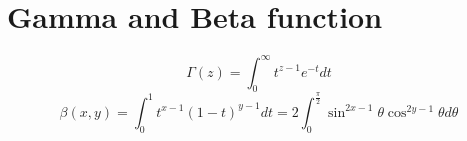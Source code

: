 \documentclass[
]{article}
\author{}
\date{}
\begin{document}
\[
\newcommand{\R}{\mathbb{R}}
\newcommand{\com}{\mathbb{C}}
\newcommand{\N}{\mathbb{N}}
\newcommand{\Z}{\mathbb{Z}}
\newcommand{\e}{\varepsilon}
\newcommand{\sequence}[1]{(#1_n)_{n=1}^{\infty}}
\newcommand{\braces}[1]{\left\{#1\right\}}
\newcommand{\ra}{\rightarrow}
\newcommand{\pdiff}[2]{\frac{\partial #1}{\partial #2}}
\newcommand{\diff}[3]{\frac{d^{#3}#1}{d#2^{#3}}}
\newcommand{\summ}[2]{\sum_{#1}^{#2}}
\newcommand{\fbraks}[1]{\left(#1\right)}
\newcommand{\tbraks}[1]{\left[#1\right]}
\]

\hypertarget{gamma-and-beta-function}{%
\section{Gamma and Beta function}\label{gamma-and-beta-function}}

\[\Gamma(z) = \int_0^\infty t^{z-1}e^{-t}dt\]
\[\beta(x,y) = \int_0 ^1 t^{x-1}(1-t)^{y-1}dt = 2\int_0 ^{\frac{\pi}{2}} \sin^{2x-1}{\theta} \cos^{2y-1}{\theta} d\theta\]
\end{document}
